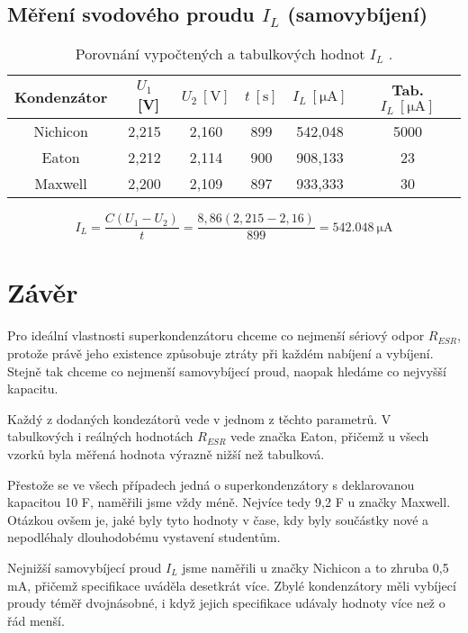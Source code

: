 \documentclass{protokol}
\begin{document}
\subsection{Měření svodového proudu \(I_{L} \) (samovybíjení)}
\begin{table}[h!]
	\centering
	\def\arraystretch{1.4}
	\begin{tabular}{|c|c|c|c|c|c|}
		\hline
		Kondenzátor & \(U_{1} \)\ [\unit{\volt}]  & \(U_{2}\ [\unit{\volt}] \)  & \(t\ [\unit{\second}] \)  & \(I_{L}\ [\unit{\micro\ampere}] \) & Tab. \(I_{L}\ [\unit{\micro\ampere}] \)  \\ \hline \hline
		Nichicon  & 2,215 & 2,160  & 899 & 542,048 & 5000 \\ \hline
		Eaton     & 2,212 & 2,114 & 900  & 908,133 & 23 \\ \hline
		Maxwell   & 2,200 & 2,109 & 897  & 933,333 & 30 \\ \hline
	\end{tabular}
	\caption{Porovnání vypočtených a tabulkových hodnot \(I_{L} \) .}
	\label{tab:ojjoij}
\end{table}

\[
	I_{L} = \frac{C(U_{1} - U_{2} )}{t}=\frac{8,86(2,215 - 2,16 )}{899}=\qty{542,048}{\micro\ampere}
\]

\clearpage
\section{Závěr}
	Pro ideální vlastnosti superkondenzátoru chceme co nejmenší sériový odpor \(R_{ESR} \), protože právě jeho existence způsobuje ztráty při každém nabíjení a vybíjení. Stejně tak chceme co nejmenší samovybíjecí proud, naopak hledáme co nejvyšší kapacitu. 
	
	Každý z dodaných kondezátorů vede v jednom z těchto parametrů. V tabulkových i reálných hodnotách \(R_{ESR} \) vede značka Eaton, přičemž u všech vzorků byla měřená hodnota výrazně nižší než tabulková. 

	Přestože se ve všech případech jedná o superkondenzátory s deklarovanou kapacitou 10 F, naměřili jsme vždy méně. Nejvíce tedy 9,2 F u značky Maxwell. Otázkou ovšem je, jaké byly tyto hodnoty v čase, kdy byly součástky nové a nepodléhaly dlouhodobému vystavení studentům. 

	Nejnižší samovybíjecí proud \(I_{L} \) jsme naměřili u značky Nichicon a to zhruba 0,5 mA, přičemž specifikace uváděla desetkrát více. Zbylé kondenzátory měli vybíjecí proudy téměř dvojnásobné, i když jejich specifikace udávaly hodnoty více než o řád menší.
\end{document}
